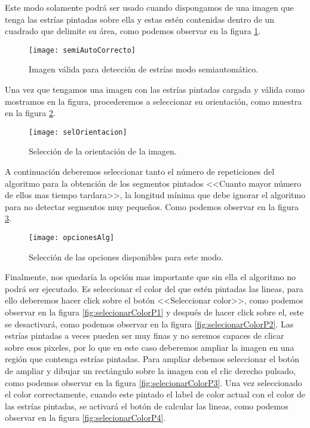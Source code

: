 Este modo solamente podrá ser usado cuando dispongamos de una imagen que tenga las estrías pintadas sobre ella y estas estén contenidas dentro de un cuadrado que delimite su área, como podemos observar en la figura \ref{fig:semiAutoCorrecto}.



\begin{figure}[h]
\centering
\texttt{[image: semiAutoCorrecto]}
\caption{Imagen válida para detección de estrías modo semiautomático.}
\label{fig:semiAutoCorrecto}
\end{figure}

Una vez que tengamos una imagen con las estrías pintadas cargada y válida como mostramos en la figura, procederemos a seleccionar su orientación, como muestra en la figura \ref{fig:selOrientacion}.

\begin{figure}[h]
\centering
\texttt{[image: selOrientacion]}
\caption{Selección de la orientación de la imagen.}
\label{fig:selOrientacion}
\end{figure}

A continuación deberemos seleccionar tanto el número de repeticiones del algoritmo para la obtención de los segmentos pintados <<Cuanto mayor número de ellos mas tiempo tardara>>, la longitud mínima que debe ignorar el algoritmo para no detectar segmentos muy pequeños. Como podemos observar en la figura \ref{fig:opcionesAlg}.

\begin{figure}[h]
\centering
\texttt{[image: opcionesAlg]}
\caption{Selección de las opciones disponibles para este modo.}
\label{fig:opcionesAlg}
\end{figure}

Finalmente, nos quedaría la opción mas importante que sin ella el algoritmo no podrá ser ejecutado. Es seleccionar el color del que estén pintadas las lineas, para ello deberemos hacer click sobre el botón <<Seleccionar color>>, como podemos observar en la figura \ref{fig:selecionarColorP1} y después de hacer click sobre el, este se desactivará, como podemos observar en la figura \ref{fig:selecionarColorP2}.
Las estrías pintadas a veces pueden ser muy finas y no seremos capaces de clicar sobre esos pixeles, por lo que en este caso deberemos ampliar la imagen en una región que contenga estrías pintadas. Para ampliar debemos seleccionar el botón de ampliar y dibujar un rectángulo sobre la imagen con el clic derecho pulsado, como podemos observar en la figura \ref{fig:selecionarColorP3}.
Una vez seleccionado el color correctamente, cuando este pintado el label de color actual con el color de las estrías pintadas, se activará el botón de calcular las lineas, como podemos observar en la figura \ref{fig:selecionarColorP4}.




